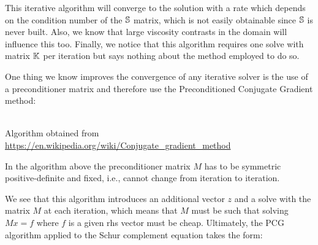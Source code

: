 This iterative algorithm will converge to the solution with a rate which depends on 
the condition number of the ${\mathbb{S}}$ matrix, which is not easily obtainable since 
${\mathbb{S}}$ is never built. Also, we know that large viscosity contrasts in the domain 
will influence this too. Finally, we notice that this algorithm requires one solve
with matrix ${\mathbb{K}}$ per iteration but says nothing about the method employed to do so.

One thing we know improves the convergence of any iterative solver is the use of a 
preconditioner matrix and therefore use the Preconditioned Conjugate Gradient method:
\begin{center}
\\
Algorithm obtained from \url{https://en.wikipedia.org/wiki/Conjugate\_gradient\_method}
\end{center}

In the algorithm above the preconditioner matrix $M$ 
has to be symmetric positive-definite and fixed, i.e., cannot change from iteration to iteration. 

We see that this algorithm introduces an additional vector $z$ and a solve with the matrix $M$
at each iteration, which means that $M$ must be such that solving $M x= f$ where $f$ is a given 
rhs vector must be cheap. Ultimately, the PCG algorithm applied to the Schur complement 
equation takes the form:

